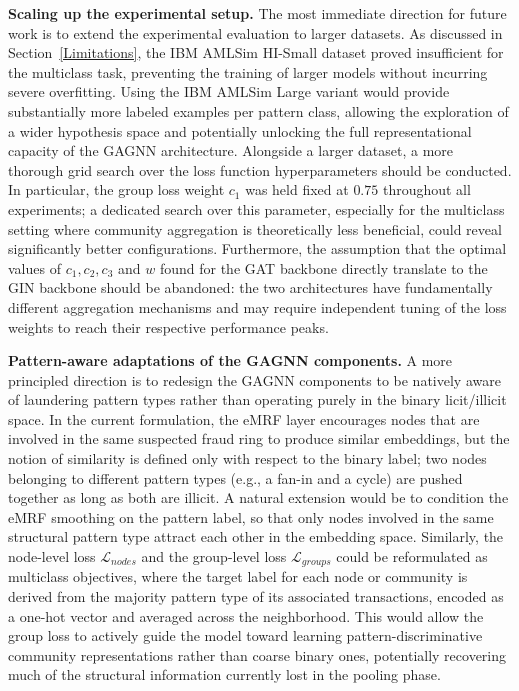 \textbf{Scaling up the experimental setup.}
The most immediate direction for future work is to extend the experimental evaluation to larger datasets. As discussed in Section~\ref{Limitations}, the IBM AMLSim HI-Small dataset proved insufficient for the multiclass task, preventing the training of larger models without incurring severe overfitting. Using the IBM AMLSim Large variant would provide substantially more labeled examples per pattern class, allowing the exploration of a wider hypothesis space and potentially unlocking the full representational capacity of the GAGNN architecture. Alongside a larger dataset, a more thorough grid search over the loss function hyperparameters should be conducted. In particular, the group loss weight \(c_1\) was held fixed at \(0.75\) throughout all experiments; a dedicated search over this parameter, especially for the multiclass setting where community aggregation is theoretically less beneficial, could reveal significantly better configurations. Furthermore, the assumption that the optimal values of \(c_1, c_2, c_3\) and \(w\) found for the GAT backbone directly translate to the GIN backbone should be abandoned: the two architectures have fundamentally different aggregation mechanisms and may require independent tuning of the loss weights to reach their respective performance peaks.

\textbf{Pattern-aware adaptations of the GAGNN components.}
A more principled direction is to redesign the GAGNN components to be natively aware of laundering pattern types rather than operating purely in the binary licit/illicit space. In the current formulation, the eMRF layer encourages nodes that are involved in the same suspected fraud ring to produce similar embeddings, but the notion of similarity is defined only with respect to the binary label; two nodes belonging to different pattern types (e.g., a fan-in and a cycle) are pushed together as long as both are illicit. A natural extension would be to condition the eMRF smoothing on the pattern label, so that only nodes involved in the same structural pattern type attract each other in the embedding space. Similarly, the node-level loss \(\mathcal{L}_{nodes}\) and the group-level loss \(\mathcal{L}_{groups}\) could be reformulated as multiclass objectives, where the target label for each node or community is derived from the majority pattern type of its associated transactions, encoded as a one-hot vector and averaged across the neighborhood. This would allow the group loss to actively guide the model toward learning pattern-discriminative community representations rather than coarse binary ones, potentially recovering much of the structural information currently lost in the pooling phase.

